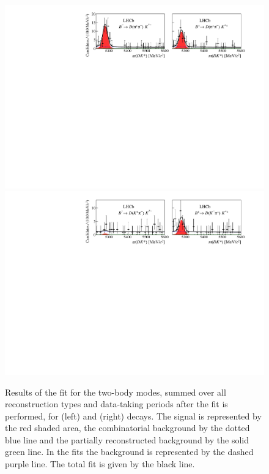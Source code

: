 \begin{figure}
\includegraphics[width=\linewidth]{figures/results/canvas_d2pipi.pdf}
\hfill
\includegraphics[width=\linewidth]{figures/results/canvas_d2pik.pdf}
\caption{Results of the \CP fit for the two-body modes, summed over all \KS reconstruction types and data-taking periods after the fit is performed, for \Bp (left) and \Bm (right) decays. The signal is represented by the red shaded area, the combinatorial background by the dotted blue line and the partially reconstructed background by the solid green line. In the \kk fits the \decay{\Lb}{\Lc\Kstarm} background is represented by the dashed purple line. The total fit is given by the black line.}
\label{results2body}
\end{figure}

